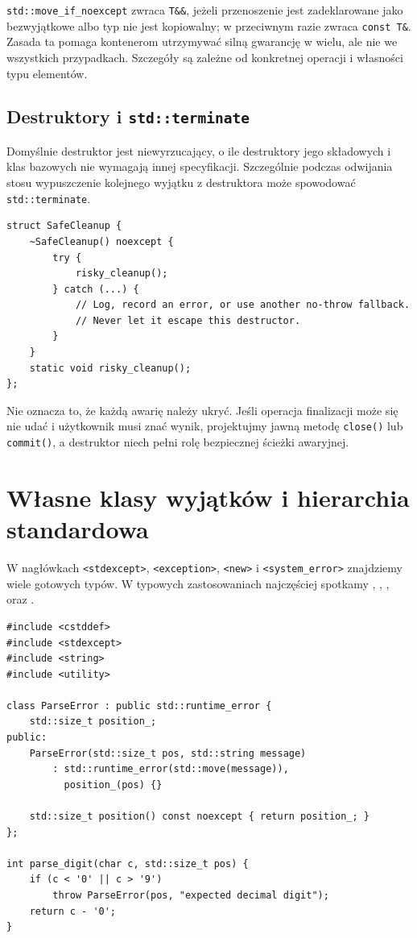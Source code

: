 \texttt{std::move\_if\_noexcept} zwraca \texttt{T\&\&}, jeżeli
przenoszenie jest zadeklarowane jako bezwyjątkowe albo typ nie jest
kopiowalny; w przeciwnym razie zwraca \texttt{const T\&}.
Zasada ta pomaga kontenerom utrzymywać silną gwarancję w wielu,
ale nie we wszystkich przypadkach. Szczegóły są zależne od
konkretnej operacji i własności typu elementów.

\subsection{Destruktory i \texttt{std::terminate}}

Domyślnie destruktor jest niewyrzucający, o ile destruktory jego
składowych i klas bazowych nie wymagają innej specyfikacji.
Szczególnie podczas odwijania stosu wypuszczenie kolejnego wyjątku
z destruktora może spowodować \texttt{std::terminate}.

\begin{lstlisting}
struct SafeCleanup {
    ~SafeCleanup() noexcept {
        try {
            risky_cleanup();
        } catch (...) {
            // Log, record an error, or use another no-throw fallback.
            // Never let it escape this destructor.
        }
    }
    static void risky_cleanup();
};
\end{lstlisting}

Nie oznacza to, że każdą awarię należy ukryć. Jeśli operacja
finalizacji może się nie udać i użytkownik musi znać wynik, projektujmy
jawną metodę \texttt{close()} lub \texttt{commit()}, a destruktor
niech pełni rolę bezpiecznej ścieżki awaryjnej.

\section{Własne klasy wyjątków i hierarchia standardowa}
\label{sec:cpp11-types}

W nagłówkach \texttt{<stdexcept>}, \texttt{<exception>},
\texttt{<new>} i \texttt{<system\_error>} znajdziemy wiele gotowych
typów. W typowych zastosowaniach najczęściej spotkamy
, ,
,  oraz
.

\begin{lstlisting}
#include <cstddef>
#include <stdexcept>
#include <string>
#include <utility>

class ParseError : public std::runtime_error {
    std::size_t position_;
public:
    ParseError(std::size_t pos, std::string message)
        : std::runtime_error(std::move(message)),
          position_(pos) {}

    std::size_t position() const noexcept { return position_; }
};

int parse_digit(char c, std::size_t pos) {
    if (c < '0' || c > '9')
        throw ParseError(pos, "expected decimal digit");
    return c - '0';
}
\end{lstlisting}

